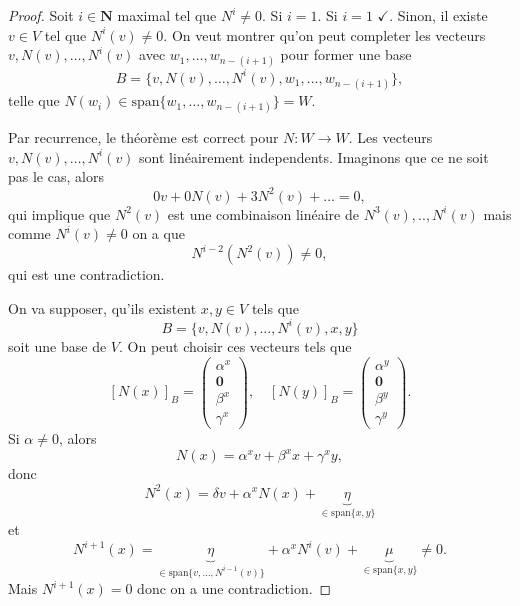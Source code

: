 \begin{proof}
Soit $i\in \mathbf{N}$ maximal tel que $N^{i}\neq 0$. Si $i=1$. Si $i=1$ $\checkmark$. Sinon, il existe $v\in V$ tel que $N^{i}(v)\neq0$. On veut montrer qu'on peut completer les vecteurs $v,N(v),\dots,N^{i}(v)$ avec $w_{1},\dots,w_{n-(i+1)}$ pour former une base
$$
B=\{ v,N(v),\dots,N^{i}(v),w_{1},\dots,w_{n-(i+1)} \},
$$
telle que $N(w_{i})\in \mathrm{span}\{ w_{1},\dots,w_{n-(i+1)} \}=W$.

Par recurrence, le théorème est correct pour $N:W\to W$. Les vecteurs $v,N(v),\dots,N^{i}(v)$ sont linéairement independents. Imaginons que ce ne soit pas le cas, alors
$$
0v+0N(v)+3N^{2}(v)+\dots=0,
$$
qui implique que $N^{2}(v)$ est une combinaison linéaire de $N^{3}(v),..,N^{i}(v)$ mais comme $N^{i}(v)\neq 0$ on a que 
$$
N^{i-2}(N^{2}(v))\neq 0,
$$
qui est une contradiction. 

On va supposer, qu'ils existent $x,y\in V$ tels que 
$$
B=\{v,N(v),\dots,N^{i}(v),x,y\}
$$
soit une base de $V$. On peut choisir ces vecteurs tels que 
$$
[N(x)]_{B}=\begin{pmatrix}
\alpha^{x} \\
\boldsymbol{0} \\
\beta^{x} \\
\gamma^{x}
\end{pmatrix},\quad [N(y)]_{B}=\begin{pmatrix}
\alpha^{y} \\
\boldsymbol{0} \\
\beta^{y} \\
\gamma^{y}
\end{pmatrix}.
$$
Si $\alpha\neq 0$, alors
$$
N(x)=\alpha^{x}v+\beta^{x}x+\gamma^{x}y,
$$
donc
$$
N^{2}(x)=\delta v+\alpha^{x}N(x)+\underbrace{ \eta }_{ \in \mathrm{span}\{ x,y \} }
$$
et
$$
N^{i+1}(x)=\underbrace{ \eta }_{ \in \mathrm{span}\{ v,\dots,N^{i-1}(v) \} } +\alpha^{x}N^{i}(v)+\underbrace{ \mu }_{ \in \mathrm{span}\{ x,y \} }\neq 0.
$$
Mais $N^{i+1}(x)=0$ donc on a une contradiction. 

\end{proof}